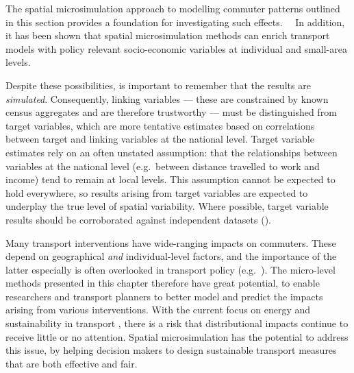 The spatial microsimulation approach to modelling commuter
patterns outlined in this section provides a foundation for investigating such
effects. 　In addition, it has been shown that spatial microsimulation methods
can enrich transport models with policy relevant socio-economic variables at
individual and small-area levels.

Despite these possibilities, is important to remember that the results are
\emph{simulated}. Consequently, 
linking variables --- these
are constrained by known census aggregates and are therefore trustworthy ---
must be distinguished from target variables, which are more tentative
estimates based on correlations between target and linking
variables at the national level. Target variable
estimates rely on an often unstated assumption: that the relationships
between variables at the national level (e.g.~between distance travelled to
work and income) tend to remain at local levels. This assumption cannot be
expected to hold everywhere, so results arising from target variables are
expected to underplay the true level of spatial variability. Where possible,
target variable results should be corroborated against independent datasets
(\citealp{Edwards2009}).

Many transport interventions have wide-ranging impacts on commuters.
These depend on geographical \emph{and} individual-level factors,
and the importance of the latter especially is often overlooked in transport policy
 (e.g.~\citealp{Tribby2012}).
The micro-level methods presented in this chapter therefore have great potential,
to enable researchers and transport planners to better model and predict the
impacts arising from various interventions.
With the current focus on energy and sustainability in transport
\citep{Chapman2007}, there is a risk that distributional impacts continue
to receive little or no attention. Spatial microsimulation
has the potential to address this issue, by helping
decision makers to design sustainable transport measures
that are both effective and fair.
